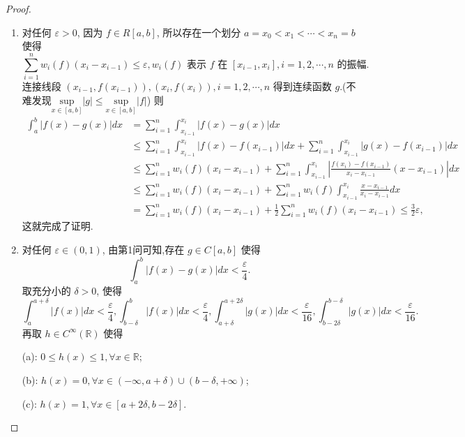 \documentclass[../../main.tex]{subfiles}
\begin{document}
\begin{proof}
\begin{enumerate}[(1)]
\item 对任何 $\varepsilon > 0$, 因为 $f \in R[a,b]$, 所以存在一个划分 $a = x_0 < x_1 < \cdots < x_n = b$ 使得
\[
\sum_{i = 1}^{n} w_i(f)(x_i - x_{i - 1}) \leqslant \varepsilon, w_i(f) \text{ 表示 } f \text{ 在 } [x_{i - 1},x_i], i = 1,2,\cdots,n \text{ 的振幅}.
\]
连接线段 $(x_{i - 1},f(x_{i - 1})),(x_i,f(x_i)), i = 1,2,\cdots,n$ 得到连续函数 $g$.(不难发现$\underset{x\in \left[ a,b \right]}{\mathrm{sup}}\left| g \right|\leqslant \underset{x\in \left[ a,b \right]}{\mathrm{sup}}\left| f \right|$) 则
\begin{align*}
\int_{a}^{b} |f(x) - g(x)|dx &= \sum_{i = 1}^{n} \int_{x_{i - 1}}^{x_i} |f(x) - g(x)|dx \\
&\leqslant \sum_{i = 1}^{n} \int_{x_{i - 1}}^{x_i} |f(x) - f(x_{i - 1})|dx + \sum_{i = 1}^{n} \int_{x_{i - 1}}^{x_i} |g(x) - f(x_{i - 1})|dx \\
&\leqslant \sum_{i = 1}^{n} w_i(f)(x_i - x_{i - 1}) + \sum_{i = 1}^{n} \int_{x_{i - 1}}^{x_i} \left| \frac{f(x_i) - f(x_{i - 1})}{x_i - x_{i - 1}} (x - x_{i - 1}) \right|dx \\
&\leqslant \sum_{i = 1}^{n} w_i(f)(x_i - x_{i - 1}) + \sum_{i = 1}^{n} w_i(f) \int_{x_{i - 1}}^{x_i} \frac{x - x_{i - 1}}{x_i - x_{i - 1}}dx \\
&= \sum_{i = 1}^{n} w_i(f)(x_i - x_{i - 1}) + \frac{1}{2} \sum_{i = 1}^{n} w_i(f)(x_i - x_{i - 1}) \leqslant \frac{3}{2}\varepsilon,
\end{align*}
这就完成了证明.

\item 对任何 $\varepsilon \in (0,1)$, 由第1问可知,存在 $g \in C[a,b]$ 使得
\[
\int_{a}^{b} |f(x) - g(x)|dx < \frac{\varepsilon}{4}.
\]
取充分小的 $\delta > 0$, 使得
\[
\int_{a}^{a + \delta} |f(x)|dx < \frac{\varepsilon}{4}, \int_{b - \delta}^{b} |f(x)|dx < \frac{\varepsilon}{4}, \int_{a + \delta}^{a + 2\delta} |g(x)|dx < \frac{\varepsilon}{16}, \int_{b - 2\delta}^{b - \delta} |g(x)|dx < \frac{\varepsilon}{16}.
\]
再取 $h \in C^{\infty}(\mathbb{R})$ 使得

(a): $0 \leqslant h(x) \leqslant 1, \forall x \in \mathbb{R}$;

(b): $h(x) = 0, \forall x \in (-\infty,a + \delta) \cup (b - \delta,+\infty)$;

(c): $h(x) = 1, \forall x \in [a + 2\delta,b - 2\delta]$.


\end{enumerate}
\end{proof}
\end{document}
